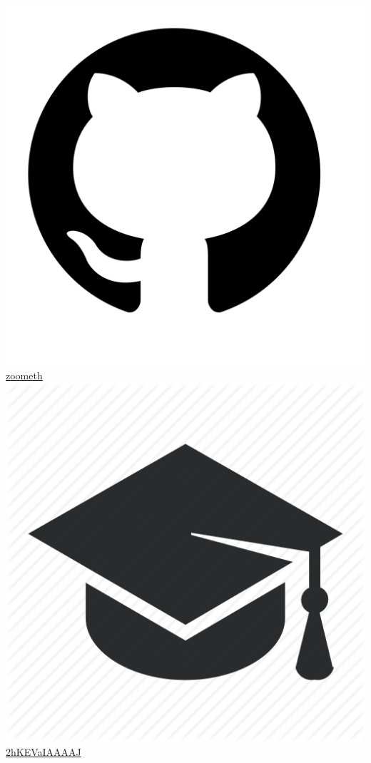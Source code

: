 \documentclass{article}
\begin{document}
\includegraphics[scale=0.01]{github} \quad \href{https://github.com/zoometh/thomashuet.github.io/blob/main/README.md}{zoometh} \\
\includegraphics[scale=0.025]{gscholar} \quad \href{https://scholar.google.fr/citations?user=2hKEVaIAAAAJ}{2hKEVaIAAAAJ} \\
\end{document}
